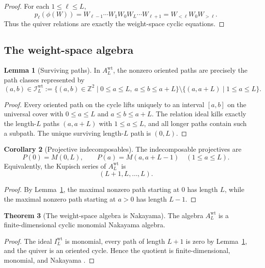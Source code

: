 \documentclass[11pt]{article}
\newcommand{\Z}{\mathbb{Z}}
\theoremstyle{definition}
\newtheorem{theorem}{Theorem}[section]
\newtheorem{lemma}[theorem]{Lemma}
\newtheorem{corollary}[theorem]{Corollary}
\begin{document}
\begin{proof}
For each \(1\leq \ell\leq L\),
\[
p_\ell(\phi(W))
=
W_{\ell-1}\cdots W_1W_0W_L\cdots W_{\ell+1}
=
W_{<\ell}W_0W_{>\ell}.
\]
Thus the quiver relations are exactly the weight-space cyclic equations.
\end{proof}

\subsection{The weight-space algebra}

\begin{lemma}[Surviving paths]
\label{lem:surviving-paths}
In \(A_L^{\mathrm{wt}}\), the nonzero oriented paths are precisely the path
classes represented by
\[
(a,b)\in \mathcal I_L^{\mathrm{wt}}
:=
\{(a,b)\in \Z^2\mid 0\leq a\leq L,\ a\leq b\leq a+L\}
\setminus
\{(a,a+L)\mid 1\leq a\leq L\}.
\]
\end{lemma}

\begin{proof}
Every oriented path on the cycle lifts uniquely to an interval \([a,b]\) on the
universal cover with \(0\leq a\leq L\) and \(a\leq b\leq a+L\). The relation
ideal kills exactly the length-\(L\) paths \((a,a+L)\) with \(1\leq a\leq L\),
and all longer paths contain such a subpath. The unique surviving length-\(L\)
path is \((0,L)\).
\end{proof}

\begin{corollary}[Projective indecomposables]
\label{cor:projectives}
The indecomposable projectives are
\[
P(0)=M(0,L),
\qquad
P(a)=M(a,a+L-1)\quad (1\leq a\leq L).
\]
Equivalently, the Kupisch series of \(A_L^{\mathrm{wt}}\) is
\[
(L+1,L,\dots,L).
\]
\end{corollary}

\begin{proof}
By Lemma~\ref{lem:surviving-paths}, the maximal nonzero path starting at \(0\)
has length \(L\), while the maximal nonzero path starting at \(a>0\) has length
\(L-1\).
\end{proof}

\begin{theorem}[The weight-space algebra is Nakayama]
\label{thm:nakayama}
The algebra \(A_L^{\mathrm{wt}}\) is a finite-dimensional cyclic monomial
Nakayama algebra.
\end{theorem}

\begin{proof}
The ideal \(I_L^{\mathrm{wt}}\) is monomial, every path of length \(L+1\) is
zero by Lemma~\ref{lem:surviving-paths}, and the quiver is an oriented cycle.
Hence the quotient is finite-dimensional, monomial, and Nakayama
\cite[Chapter~VI]{assem2006}.
\end{proof}
\end{document}
